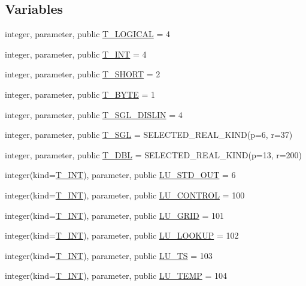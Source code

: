 \subsection*{Variables}
\begin{DoxyCompactItemize}
\item 
integer, parameter, public \hyperlink{namespacetest_acdeac586276a7d1d394fb5eddc77fc3d}{T\_\-LOGICAL} = 4
\item 
integer, parameter, public \hyperlink{namespacetest_a6f91ebd89b58cfcc5da99faed9385c1e}{T\_\-INT} = 4
\item 
integer, parameter, public \hyperlink{namespacetest_a78d9db20f77ee4f9cf3ac5abfb7062b9}{T\_\-SHORT} = 2
\item 
integer, parameter, public \hyperlink{namespacetest_a3023425eff6a423b04bc28123a79fda5}{T\_\-BYTE} = 1
\item 
integer, parameter, public \hyperlink{namespacetest_ade95807442cb41fc39b288b86e82bccd}{T\_\-SGL\_\-DISLIN} = 4
\item 
integer, parameter, public \hyperlink{namespacetest_a04d8b9090502de3a00046fe904bc3d99}{T\_\-SGL} = SELECTED\_\-REAL\_\-KIND(p=6, r=37)
\item 
integer, parameter, public \hyperlink{namespacetest_af379b935264d350d76bf75331181e241}{T\_\-DBL} = SELECTED\_\-REAL\_\-KIND(p=13, r=200)
\item 
integer(kind=\hyperlink{namespacetest_a6f91ebd89b58cfcc5da99faed9385c1e}{T\_\-INT}), parameter, public \hyperlink{namespacetest_ae2c473e7eff311b67b82175c92417cea}{LU\_\-STD\_\-OUT} = 6
\item 
integer(kind=\hyperlink{namespacetest_a6f91ebd89b58cfcc5da99faed9385c1e}{T\_\-INT}), parameter, public \hyperlink{namespacetest_ae6a297220869ce598523186f326bef7c}{LU\_\-CONTROL} = 100
\item 
integer(kind=\hyperlink{namespacetest_a6f91ebd89b58cfcc5da99faed9385c1e}{T\_\-INT}), parameter, public \hyperlink{namespacetest_a5255cf8d0506fee4cf94c76d1bcb541d}{LU\_\-GRID} = 101
\item 
integer(kind=\hyperlink{namespacetest_a6f91ebd89b58cfcc5da99faed9385c1e}{T\_\-INT}), parameter, public \hyperlink{namespacetest_a269ea2c4032752326f4745d24712c02f}{LU\_\-LOOKUP} = 102
\item 
integer(kind=\hyperlink{namespacetest_a6f91ebd89b58cfcc5da99faed9385c1e}{T\_\-INT}), parameter, public \hyperlink{namespacetest_a1a6873182d00ba61beb421697cbe8662}{LU\_\-TS} = 103
\item 
integer(kind=\hyperlink{namespacetest_a6f91ebd89b58cfcc5da99faed9385c1e}{T\_\-INT}), parameter, public \hyperlink{namespacetest_a3f833495aa697889b22b2de1d999641c}{LU\_\-TEMP} = 104

\end{DoxyCompactItemize}
